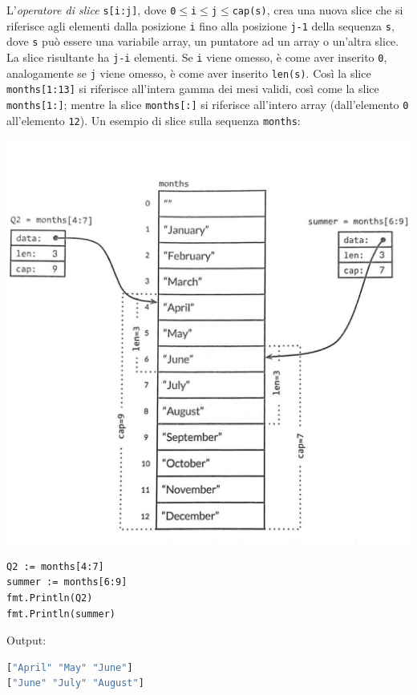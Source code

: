 \documentclass[../../thesis.tex]{subfiles}
\begin{document}
    L'\textit{operatore di slice} \verb"s[i:j]", dove \verb"0"$\le$\verb"i"$\le$\verb"j"$\le$\verb"cap(s)", crea una nuova slice che si riferisce agli elementi dalla posizione \verb"i" fino alla posizione \verb"j-1" della sequenza \verb"s", dove \verb"s" può essere una variabile array, un puntatore ad un array o un'altra slice.
    La slice risultante ha \verb"j-i" elementi.
    Se \verb"i" viene omesso, è come aver inserito \verb"0", analogamente se \verb"j" viene omesso, è come aver inserito \verb"len(s)".
    Così la slice \verb"months[1:13]" si riferisce all'intera gamma dei mesi validi, così come la slice \verb"months[1:]"; mentre la slice \verb"months[:]" si riferisce all'intero array (dall'elemento \verb"0" all'elemento \verb"12").
    Un esempio di slice sulla sequenza \verb"months":
    \begin{center}
        \includegraphics[scale = 0.25]{figures/figura-4.1}
    \end{center}
    \begin{lstlisting}[frame = single,label={lst:lstlisting3-2.2}]
Q2 := months[4:7]
summer := months[6:9]
fmt.Println(Q2)
fmt.Println(summer)
    \end{lstlisting}
    Output:
    \begin{lstlisting}[language = bash, frame = L,label={lst:lstlisting3-2.3}]
["April" "May" "June"]
["June" "July" "August"]
    \end{lstlisting}
\end{document}

